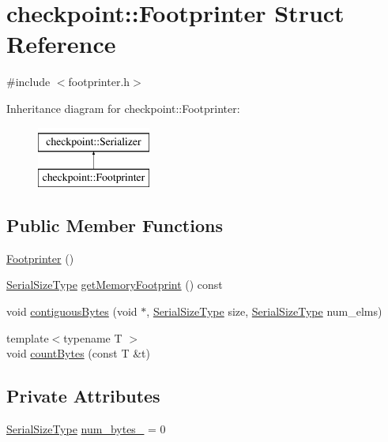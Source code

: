 \hypertarget{structcheckpoint_1_1_footprinter}{}\section{checkpoint\+:\+:Footprinter Struct Reference}
\label{structcheckpoint_1_1_footprinter}


{\ttfamily \#include $<$footprinter.\+h$>$}

Inheritance diagram for checkpoint\+:\+:Footprinter\+:\begin{figure}[H]
\begin{center}
\leavevmode
\includegraphics[height=2.000000cm]{structcheckpoint_1_1_footprinter}
\end{center}
\end{figure}
\subsection*{Public Member Functions}
\begin{DoxyCompactItemize}
\item 
\hyperlink{structcheckpoint_1_1_footprinter_a79d7f7f0b753be09ac841dfd1af4a4d4}{Footprinter} ()
\item 
\hyperlink{namespacecheckpoint_a083f6674da3f94c2901b18c6d238217c}{Serial\+Size\+Type} \hyperlink{structcheckpoint_1_1_footprinter_ad3131f63bf74b018c66e9fe3f0f31fca}{get\+Memory\+Footprint} () const
\item 
void \hyperlink{structcheckpoint_1_1_footprinter_a88872ac85c679331c2bd4ab5d26e585a}{contiguous\+Bytes} (void $\ast$, \hyperlink{namespacecheckpoint_a083f6674da3f94c2901b18c6d238217c}{Serial\+Size\+Type} size, \hyperlink{namespacecheckpoint_a083f6674da3f94c2901b18c6d238217c}{Serial\+Size\+Type} num\+\_\+elms)
\item 
{\footnotesize template$<$typename T $>$ }\\void \hyperlink{structcheckpoint_1_1_footprinter_a68f3c6a41c6f5f15b596dec55ab0ba5f}{count\+Bytes} (const T \&t)
\end{DoxyCompactItemize}
\subsection*{Private Attributes}
\begin{DoxyCompactItemize}
\item 
\hyperlink{namespacecheckpoint_a083f6674da3f94c2901b18c6d238217c}{Serial\+Size\+Type} \hyperlink{structcheckpoint_1_1_footprinter_aa1e1872e87895430c567eb893b6f74bf}{num\+\_\+bytes\+\_\+} = 0
\end{DoxyCompactItemize}
